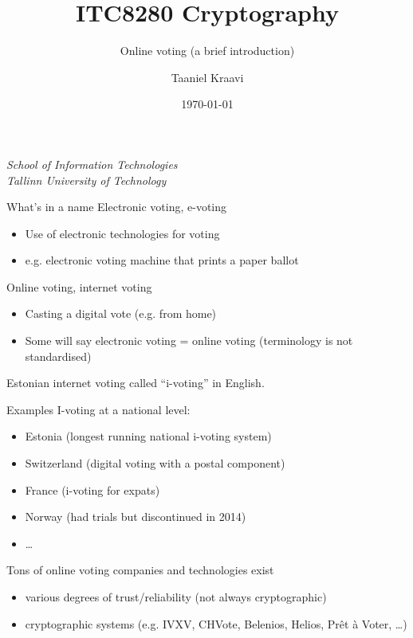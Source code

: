 \graphicspath{ {../../images/} }
\usetikzlibrary{positioning,calc,external}

\title{ITC8280 Cryptography}
\subtitle{Online voting (a brief introduction)}
\date{\today}
\author{Taaniel Kraavi}
\institute%
{%
  \textit{School of Information Technologies}\\
  \textit{Tallinn University of Technology}
}


\begin{frame}
  \titlepage
\end{frame}

\begin{frame}{What's in a name}
  Electronic voting, e-voting
  \begin{itemize}[<+(1)->]
    \item Use of electronic technologies for voting
    \item e.g. electronic voting machine that prints a paper ballot
  \end{itemize}

  \pause
  Online voting, internet voting
  \begin{itemize}[<+(1)->]
    \item Casting a digital vote (e.g. from home)
    \item Some will say electronic voting = online voting (terminology is not standardised)
  \end{itemize}

  \pause
  Estonian internet voting called \enquote{i-voting} in English.
\end{frame}

\begin{frame}{Examples}
  I-voting at a national level:
  \begin{itemize}[<+(1)->]
    \item Estonia (longest running national i-voting system)
    \item Switzerland (digital voting with a postal component)
    \item France (i-voting for expats)
    \item Norway (had trials but discontinued in 2014)
    \item \dots
  \end{itemize}

  \pause
  Tons of online voting companies and technologies exist
  \begin{itemize}[<+(1)->]
    \item various degrees of trust/reliability (not always cryptographic)
    \item cryptographic systems (e.g. IVXV, CHVote, Belenios, Helios, Prêt à Voter, \dots)
  \end{itemize}
\end{frame}

